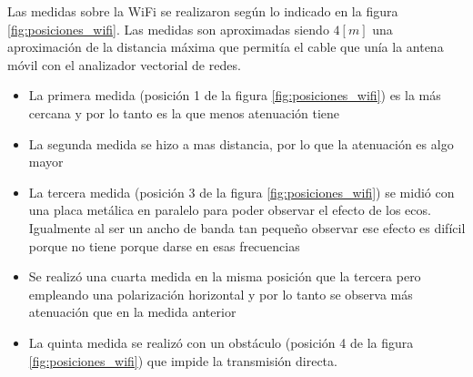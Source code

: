 \documentclass[10pt,conference,a4paper]{IEEEtran}
\begin{document}
Las medidas sobre la WiFi se realizaron según lo indicado en la figura \ref{fig:posiciones_wifi}. Las medidas son aproximadas siendo $4[m]$ una aproximación de la distancia máxima que permitía el cable que unía la antena móvil con el analizador vectorial de redes.

\begin{itemize}
    \item La primera medida (posición 1 de la figura \ref{fig:posiciones_wifi}) es la más cercana y por lo tanto es la que menos atenuación tiene
    \item La segunda medida se hizo a mas distancia, por lo que la atenuación es algo mayor 
    \item La tercera medida (posición 3 de la figura \ref{fig:posiciones_wifi}) se midió con una placa metálica en paralelo para poder observar el efecto de los ecos. Igualmente al ser un ancho de banda tan pequeño observar ese efecto es difícil porque no tiene porque darse en esas frecuencias
    \item Se realizó una cuarta medida en la misma posición que la tercera pero empleando una polarización horizontal y por lo tanto se observa más atenuación que en la medida anterior
    \item La quinta medida se realizó con un obstáculo (posición 4 de la figura \ref{fig:posiciones_wifi}) que impide la transmisión directa.
\end{itemize}
\end{document}

